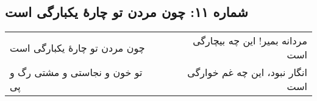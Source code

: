 \begin{center}
\section*{شماره ۱۱: چون مردن تو چارۀ یکبارگی است}
\label{sec:011}
\begin{longtable}{l p{0.5cm} r}
چون مردن تو چارهٔ یکبارگی است
&&
مردانه بمیر! این چه بیچارگی است
\\
تو خون و نجاستی و مشتی رگ و پی
&&
انگار نبود، این چه غم خوارگی است
\\
\end{longtable}
\end{center}

